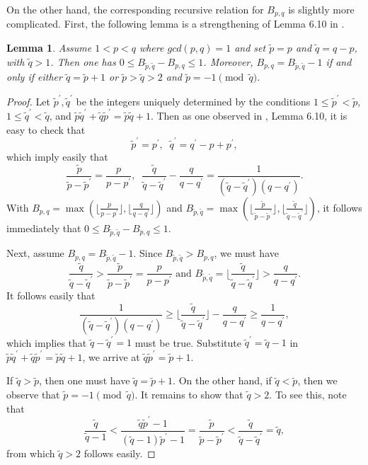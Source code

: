 \documentclass[11pt]{amsart}
\theoremstyle{plain}
\numberwithin{theorem}{section}
\newtheorem{lemma}[theorem]{Lemma}
\theoremstyle{definition}
\begin{document}
On the other hand, the corresponding recursive relation for $B_{p,q}$ is slightly more complicated. 
First, the following lemma is a strengthening of Lemma 6.10 in \cite{C}.

\begin{lemma}
Assume $1<p<q$ where $gcd(p,q)=1$ and set $\tilde{p}=p$ and $\tilde{q}=q-p$, with $\tilde{q}>1$.
Then one has $0\leq B_{\tilde{p},\tilde{q}}-B_{p,q}\leq 1$. Moreover, $B_{p,q}=B_{\tilde{p},\tilde{q}}-1$
if and only if either $\tilde{q}=\tilde{p}+1$ or $\tilde{p}>\tilde{q}>2$ and $\tilde{p}=-1 \pmod{\tilde{q}}$. 
\end{lemma}

\begin{proof}
Let $\tilde{p}^\prime,\tilde{q}^\prime$ be the integers uniquely determined by the conditions 
$1\leq \tilde{p}^\prime<\tilde{p}$, $1\leq \tilde{q}^\prime<\tilde{q}$, and 
$\tilde{p}\tilde{q}^\prime+\tilde{q}\tilde{p}^\prime=\tilde{p}\tilde{q}+1$. Then as one observed in \cite{C},
Lemma 6.10, it is easy to check that 
$$
\tilde{p}^\prime =p^\prime, \;\; \tilde{q}^\prime=q^\prime-p+p^\prime,
$$
which imply easily that
$$
\frac{\tilde{p}}{\tilde{p}-\tilde{p}^\prime}=\frac{p}{p-p^\prime}, \;\; 
\frac{\tilde{q}}{\tilde{q}-\tilde{q}^\prime}-\frac{q}{q-q^\prime}=\frac{1}{(\tilde{q}-\tilde{q}^\prime)(q-q^\prime)}. 
$$
With $B_{p,q}=\max (\lfloor \frac{p}{p-p^\prime}\rfloor, \lfloor \frac{q}{q-q^\prime}\rfloor)$ and
$B_{\tilde{p},\tilde{q}}=\max (\lfloor \frac{\tilde{p}}{\tilde{p}-\tilde{p}^\prime}\rfloor, \lfloor 
\frac{\tilde{q}}{\tilde{q}-\tilde{q}^\prime}\rfloor)$, it follows immediately that
$0\leq B_{\tilde{p},\tilde{q}}-B_{p,q}\leq 1$.

Next, assume $B_{p,q}=B_{\tilde{p},\tilde{q}}-1$. Since $B_{\tilde{p},\tilde{q}}>B_{p,q}$, we must have 
$$
\frac{\tilde{q}}{\tilde{q}-\tilde{q}^\prime}> 
\frac{\tilde{p}}{\tilde{p}-\tilde{p}^\prime}=\frac{{p}}{{p}-{p}^\prime} \mbox{ and }
B_{\tilde{p},\tilde{q}}=\lfloor \frac{\tilde{q}}{\tilde{q}-\tilde{q}^\prime}\rfloor>\frac{q}{q-q^\prime}.
$$
It follows easily that
$$
\frac{1}{(\tilde{q}-\tilde{q}^\prime)(q-q^\prime)}\geq 
\lfloor \frac{\tilde{q}}{\tilde{q}-\tilde{q}^\prime}\rfloor-\frac{q}{q-q^\prime}\geq \frac{1}{q-q^\prime}, 
$$
which implies that $\tilde{q}-\tilde{q}^\prime=1$ must be true. Substitute $\tilde{q}^\prime=\tilde{q}-1$ 
in $\tilde{p}\tilde{q}^\prime+\tilde{q}\tilde{p}^\prime=\tilde{p}\tilde{q}+1$, we arrive at
$\tilde{q}\tilde{p}^\prime=\tilde{p}+1$. 

If $\tilde{q}>\tilde{p}$, then one must have $\tilde{q}=\tilde{p}+1$. On the other hand, if $\tilde{q}<\tilde{p}$, then we observe that  $\tilde{p}=-1 \pmod{\tilde{q}}$. It remains to show that 
$\tilde{q}>2$. To see this, note that 
$$
\frac{\tilde{q}}{\tilde{q}-1}<\frac{\tilde{q}\tilde{p}^\prime-1}{(\tilde{q}-1)\tilde{p}^\prime-1}=
\frac{\tilde{p}}{\tilde{p}-\tilde{p}^\prime}<\frac{\tilde{q}}{\tilde{q}-\tilde{q}^\prime}=\tilde{q},
$$
from which $\tilde{q}>2$ follows easily. 


\end{proof}
\end{document}
